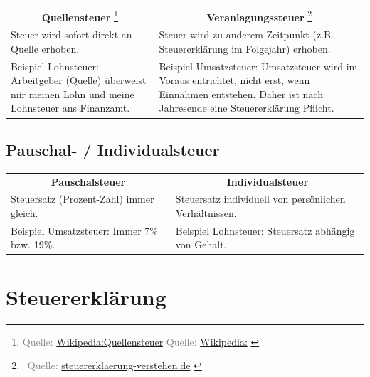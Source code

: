\documentclass{beamer}
\let\oldfootnote\footnote
\renewcommand{\footnote}[1]
{%
	\oldfootnote
	{
		\tiny
		\textcolor{gray}{#1}
	}%
}
\newcommand{\citewiki}[2][]
{%
	\footnote
	{
		\ifthenelse{\isempty{#1}}
		{
			Quelle: \href{https://de.wikipedia.org/wiki/#2}{Wikipedia:#2}
		}
		{
			Quelle: \href{https://de.wikipedia.org/wiki/#2}{Wikipedia:#1}
		}
	}
}
\newcommand{\citeurl}[2]
{%
	\footnote{\ Quelle: \href{#1}{#2}}
}
\begin{document}
			\begin{frame}
				\begin{tabularx}{\linewidth}{X|X}
					\multicolumn{1}{c|}{\textbf{Quellensteuer}\citewiki{Quellensteuer}} &
					\multicolumn{1}{c}{\textbf{Veranlagungssteuer}\citeurl{https://www.steuererklaerung-verstehen.de/lexikon/veranlagungssteuer}{steuererklaerung-verstehen.de}} \\[0.25cm]
					Steuer wird sofort direkt an Quelle erhoben. & Steuer wird zu anderem Zeitpunkt (z.B. Steuererklärung im Folgejahr) erhoben.\\
					\vspace{0.25cm} Beispiel Lohnsteuer:\newline
						Arbeitgeber (Quelle) überweist mir meinen Lohn und meine Lohnsteuer ans Finanzamt. &
					\vspace{0.25cm} Beispiel Umsatzsteuer:\newline
						Umsatzsteuer wird im Voraus entrichtet, nicht erst, wenn Einnahmen entstehen. Daher ist nach Jahresende eine Steuererklärung Pflicht.
				\end{tabularx}
			\end{frame}
		
		\subsection{Pauschal- / Individualsteuer}
		
			\begin{frame}
				\begin{tabularx}{\linewidth}{X|X}
					\multicolumn{1}{c|}{\textbf{Pauschalsteuer}} &
					\multicolumn{1}{c}{\textbf{Individualsteuer}} \\[0.25cm]
					Steuersatz (Prozent-Zahl) immer gleich. & Steuersatz individuell von persönlichen Verhältnissen.\\
					\vspace{0.25cm} Beispiel Umsatzsteuer:\newline
						Immer 7\% bzw. 19\%. &
					\vspace{0.25cm} Beispiel Lohnsteuer:\newline
						Steuersatz abhängig von Gehalt.
				\end{tabularx}
			\end{frame}
	
	\section{Steuererklärung}
	
\end{document}
